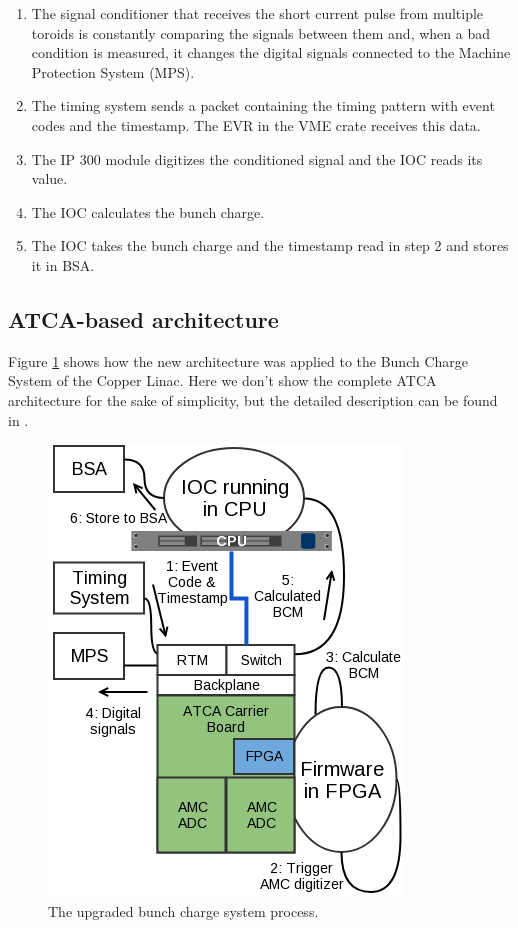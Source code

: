 \documentclass[letter,
        biblatex,   %
        keeplastbox,  %
        ]{jacow}
\begin{document}
\begin{enumerate}
  \item The signal conditioner that receives the short current pulse from multiple toroids is constantly comparing the signals between them and, when a bad condition is measured, it changes the digital signals connected to the Machine Protection System (MPS).
  \item The timing system sends a packet containing the timing pattern with event codes and the timestamp. The EVR in the VME crate receives this data.
  \item The IP 300 module digitizes the conditioned signal and the IOC reads its value.
  \item The IOC calculates the bunch charge.
  \item The IOC takes the bunch charge and the timestamp read in step 2 and stores it in BSA.
\end{enumerate}

\subsection{ATCA-based architecture}
Figure \ref{fig:bcm_atca} shows how the new architecture was applied to the Bunch Charge System of the Copper Linac. Here we don't show the complete ATCA architecture for the sake of simplicity, but the detailed description can be found in \cite{ryan-2016, atca-bpm-2017}.

\begin{figure}[!htb]
  \centering
  \includegraphics*[width=.8\columnwidth]{BCM_ATCA_Process}
  \caption{The upgraded bunch charge system process.}
  \label{fig:bcm_atca}
\end{figure}
\end{document}
